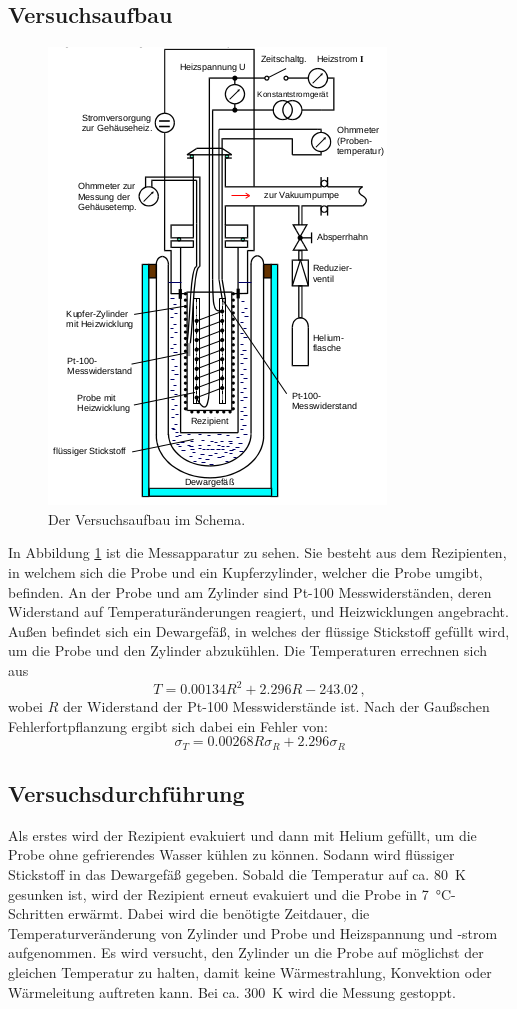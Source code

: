 \subsection{Versuchsaufbau}
\begin{figure}
  \centering
  \includegraphics[scale=0.4]{aufbau.png}
  \caption{Der Versuchsaufbau im Schema.}
  \label{fig:1}
\end{figure}
In Abbildung \ref{fig:1} ist die Messapparatur zu sehen. Sie besteht aus dem Rezipienten,
in welchem sich die Probe und ein Kupferzylinder, welcher die Probe umgibt, befinden.
An der Probe und am Zylinder sind Pt-100 Messwiderständen,
deren Widerstand auf Temperaturänderungen reagiert, und Heizwicklungen angebracht.
Außen befindet sich ein Dewargefäß,
in welches der flüssige Stickstoff gefüllt wird, um die Probe und den Zylinder abzukühlen.
Die Temperaturen errechnen sich aus
\begin{equation}
  T = 0.00134 R^2 + 2.296 R - 243.02 \, ,
  \label{widerstand}
\end{equation}
wobei $R$ der Widerstand der Pt-100 Messwiderstände ist. Nach der Gaußschen
Fehlerfortpflanzung ergibt sich dabei ein Fehler von:
\begin{equation}
  \sigma_T = 0.00268 R \sigma_R + 2.296 \sigma_R
\end{equation}

\subsection{Versuchsdurchführung}
Als erstes wird der Rezipient evakuiert und dann mit Helium gefüllt, um die Probe
ohne gefrierendes Wasser kühlen zu können. Sodann wird flüssiger Stickstoff in das
Dewargefäß gegeben. Sobald die Temperatur auf ca. \SI{80}{\kelvin} gesunken ist,
wird der Rezipient erneut evakuiert und die Probe in \SI{7}{\celsius}-
Schritten erwärmt. Dabei wird die benötigte Zeitdauer, die Temperaturveränderung
von Zylinder und Probe und Heizspannung und -strom aufgenommen. Es wird versucht,
den Zylinder un die Probe auf möglichst der gleichen Temperatur zu halten, damit
keine Wärmestrahlung, Konvektion oder Wärmeleitung auftreten kann. Bei ca. \SI{300}{\kelvin}
wird die Messung gestoppt.
